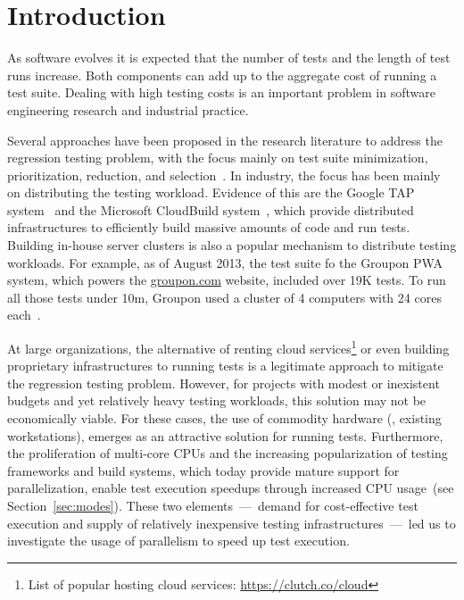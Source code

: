 \section{Introduction}
\label{sec:intro}


As software evolves it is expected that the number of tests and the
length of test runs increase.  Both components can add up to the
aggregate cost of running a test suite.  Dealing with high testing
costs is an important problem in software engineering research and
industrial practice.

Several approaches have been proposed in the research literature to
address the regression testing problem, with the focus mainly on test
suite minimization, prioritization, reduction, and
selection~\cite{yoo-harman-stvr2012}.  In industry, the focus has been
mainly on distributing the testing workload.  Evidence of this are the
Google TAP system~\cite{google-tap,google-ci} and the Microsoft
CloudBuild system~\cite{prasad-shulte-ieee-microsoft-ci}, which
provide distributed infrastructures to efficiently build massive
amounts of code and run tests.  Building in-house server clusters is also a
popular mechanism to distribute testing workloads.  For example, as of
August 2013, the test suite fo the Groupon PWA system, which powers the
\url{groupon.com} website, included over 19K tests.  To run all those
tests under 10m, Groupon used a cluster of 4 computers with 24 cores
each~\cite{kim-etal-fse2013}.

At large organizations, the alternative of renting cloud
services\footnote{List of popular hosting cloud services:
  \url{https://clutch.co/cloud}} or even building proprietary
infrastructures to running tests is a legitimate approach to mitigate
the regression testing problem.  However, for projects with modest
 or inexistent budgets and yet relatively heavy testing workloads, this solution may
not be economically viable.  For these cases, the use of commodity
hardware (\eg{}, existing workstations), emerges as an attractive
solution for running tests.  Furthermore, the proliferation of
multi-core CPUs and the increasing popularization of testing
frameworks and build systems, which today provide mature support for
parallelization, enable test execution speedups through increased CPU
usage~(see Section~\ref{sec:modes}).  These two elements~---~demand
for cost-effective test execution and supply of relatively inexpensive
testing infrastructures~---~led us to investigate the usage of
parallelism to speed up test execution.

